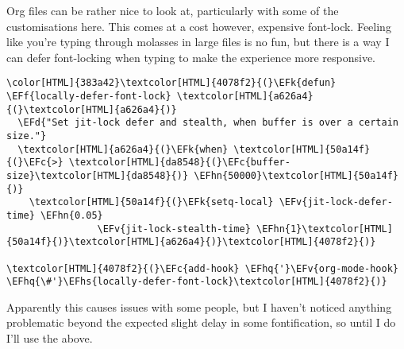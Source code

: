 \documentclass{scrartcl}
\newcommand{\EFk}[1]{\textcolor{EFk}{#1}} %
\newcommand{\EFd}[1]{\textcolor{EFd}{\textit{#1}}} %
\newcommand{\EFc}[1]{\textcolor{EFc}{#1}} %
\newcommand{\EFv}[1]{\textcolor{EFv}{#1}} %
\newcommand{\EFf}[1]{\textcolor{EFf}{#1}} %
\newcommand{\EFhn}[1]{\textcolor{EFhn}{\textbf{#1}}} %
\newcommand{\EFhq}[1]{\textcolor{EFhq}{#1}} %
\newcommand{\EFhs}[1]{\textcolor{EFhs}{#1}} %
\begin{document}
Org files can be rather nice to look at, particularly with some of the
customisations here. This comes at a cost however, expensive font-lock.
Feeling like you're typing through molasses in large files is no fun, but there
is a way I can defer font-locking when typing to make the experience more
responsive.
\begin{Code}
\begin{Verbatim}[]
\color[HTML]{383a42}\textcolor[HTML]{4078f2}{(}\EFk{defun} \EFf{locally-defer-font-lock} \textcolor[HTML]{a626a4}{(}\textcolor[HTML]{a626a4}{)}
  \EFd{"Set jit-lock defer and stealth, when buffer is over a certain size."}
  \textcolor[HTML]{a626a4}{(}\EFk{when} \textcolor[HTML]{50a14f}{(}\EFc{>} \textcolor[HTML]{da8548}{(}\EFc{buffer-size}\textcolor[HTML]{da8548}{)} \EFhn{50000}\textcolor[HTML]{50a14f}{)}
    \textcolor[HTML]{50a14f}{(}\EFk{setq-local} \EFv{jit-lock-defer-time} \EFhn{0.05}
                \EFv{jit-lock-stealth-time} \EFhn{1}\textcolor[HTML]{50a14f}{)}\textcolor[HTML]{a626a4}{)}\textcolor[HTML]{4078f2}{)}

\textcolor[HTML]{4078f2}{(}\EFc{add-hook} \EFhq{'}\EFv{org-mode-hook} \EFhq{\#'}\EFhs{locally-defer-font-lock}\textcolor[HTML]{4078f2}{)}
\end{Verbatim}
\end{Code}
Apparently this causes issues with some people, but I haven't noticed anything
problematic beyond the expected slight delay in some fontification, so until I
do I'll use the above.
\end{document}
